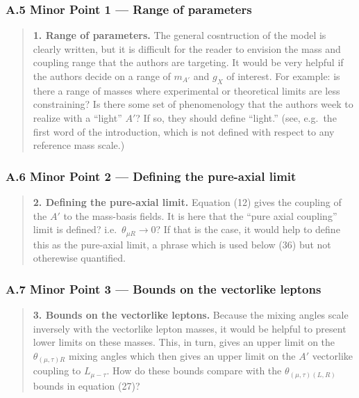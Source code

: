 \documentclass[
  chinese,
  UTF8]{ctexart}
\begin{document}
\subsubsection{A.5 Minor Point 1 --- Range of
parameters}\label{a.5-minor-point-1-range-of-parameters}

\begin{quote}
\textbf{1. Range of parameters.} The general cosntruction of the model
is clearly written, but it is difficult for the reader to envision the
mass and coupling range that the authors are targeting. It would be very
helpful if the authors decide on a range of \(m_{A'}\) and \(g_X\) of
interest. For example: is there a range of masses where experimental or
theoretical limits are less constraining? Is there some set of
phenomenology that the authors week to realize with a ``light'' \(A'\)?
If so, they should define ``light.'' (see, e.g.~the first word of the
introduction, which is not defined with respect to any reference mass
scale.)
\end{quote}

\subsubsection{A.6 Minor Point 2 --- Defining the pure-axial
limit}\label{a.6-minor-point-2-defining-the-pure-axial-limit}

\begin{quote}
\textbf{2. Defining the pure-axial limit.} Equation (12) gives the
coupling of the \(A'\) to the mass-basis fields. It is here that the
``pure axial coupling'' limit is defined? i.e.~\(\theta_{\mu R}\to0\)?
If that is the case, it would help to define this as the pure-axial
limit, a phrase which is used below (36) but not otherewise quantified.
\end{quote}

\subsubsection{A.7 Minor Point 3 --- Bounds on the vectorlike
leptons}\label{a.7-minor-point-3-bounds-on-the-vectorlike-leptons}

\begin{quote}
\textbf{3. Bounds on the vectorlike leptons.} Because the mixing angles
scale inversely with the vectorlike lepton masses, it would be helpful
to present lower limits on these masses. This, in turn, gives an upper
limit on the \(\theta_{(\mu,\tau)R}\) mixing angles which then gives an
upper limit on the \(A'\) vectorlike coupling to \(L_{\mu-\tau}\). How
do these bounds compare with the \(\theta_{(\mu,\tau)(L,R)}\) bounds in
equation (27)?
\end{quote}
\end{document}
